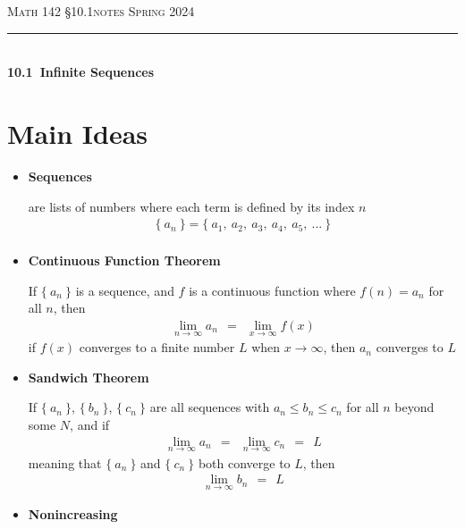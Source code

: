 \documentclass{article}
\begin{document}
\def\chapt{10.1}
\def\chaptname{Infinite Sequences}

\noindent
{\scshape Math 142} \hfill {\scshape \S\chapt notes} \hfill {\scshape Spring 2024}

\smallskip

\hrule

\bigskip

\hfill
\\

{
\huge
\noindent
\textbf{\chapt~\chaptname}
}

\thispagestyle{empty}

\section*{Main Ideas}

\begin{itemize}

\item
\textbf{Sequences}

are lists of numbers where each term is defined by its index $n$
\begin{gather*}
\{~a_n~\} = \{~ a_1,~ a_2,~ a_3,~ a_4,~ a_5,~... ~\}
\\
\end{gather*}

\item
\textbf{Continuous Function Theorem}

If $\{~ a_n ~\}$ is a sequence, and $f$ is a continuous function where $f(n)=a_n$
for all $n$, then
\begin{gather*}
\lim_{n \to \infty} a_n
~~=~~
\lim_{x \to \infty} f(x)
\end{gather*}
if $f(x)$ converges to a finite number $L$ when $x \to \infty$, then $a_n$ converges to $L$
\hfill
\\

\item
\textbf{Sandwich Theorem}

If $\{~ a_n ~\}$, $\{~ b_n ~\}$, $\{~ c_n ~\}$ are all sequences with $a_n \leq b_n \leq c_n$
for all $n$ beyond some $N$, and if
\begin{gather*}
\lim_{n \to \infty} a_n
~~=~~
\lim_{n \to \infty} c_n
~~=~~ L
\end{gather*}
meaning that $\{~ a_n ~\}$ and $\{~ c_n ~\}$ both converge to $L$, then
\begin{gather*}
\lim_{n \to \infty} b_n
~~=~~ L
\end{gather*}

\item
\textbf{Nonincreasing}


\end{itemize}
\end{document}
